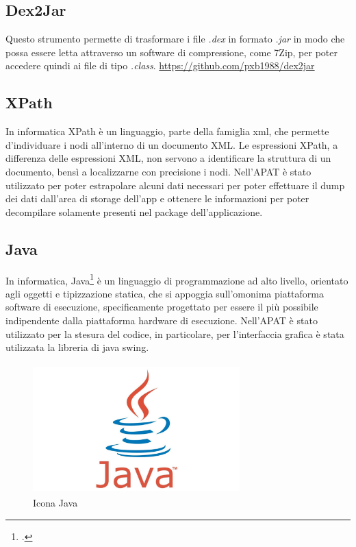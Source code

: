 \subsection*{Dex2Jar}
Questo strumento permette di trasformare i file \textit{.dex} in formato \textit{.jar} in modo che possa essere letta attraverso un software di compressione, come 7Zip, per poter accedere quindi ai file di tipo \textit{.class}.
\url{https://github.com/pxb1988/dex2jar}

\subsection*{XPath}\label{subsec:xpath}
In informatica XPath è un linguaggio, parte della famiglia \gls{xml}, che permette d'individuare i nodi all'interno di un documento XML. Le espressioni XPath, a differenza delle espressioni XML, non servono a identificare la struttura di un documento, bensì a localizzarne con precisione i nodi.
Nell'APAT è stato utilizzato per poter estrapolare alcuni dati necessari per poter effettuare il dump dei dati dall'area di storage dell'app e ottenere le informazioni per poter decompilare solamente presenti nel package dell'applicazione.

\subsection*{Java}
In informatica, Java\footcite{womak:effective-java} è un linguaggio di programmazione ad alto livello, orientato agli oggetti e tipizzazione statica, che si appoggia sull'omonima piattaforma software di esecuzione, specificamente progettato per essere il più possibile indipendente dalla piattaforma hardware di esecuzione.
Nell'APAT è stato utilizzato per la stesura del codice, in particolare, per l'interfaccia grafica è stata utilizzata la libreria di java    \gls{swing}.
\begin{figure}[H]
    \centering
    \includegraphics[width=8cm, height=5cm]{./immagini/java.jpg}
    \caption{Icona Java}\label{fig:java}
\end{figure}

